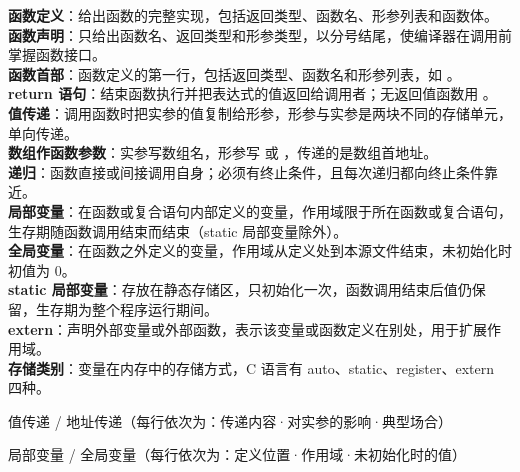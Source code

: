 \documentclass[a4paper,11pt]{article}
\begin{document}
\begin{keyterms}
\textbf{函数定义}：给出函数的完整实现，包括返回类型、函数名、形参列表和函数体。\\
\textbf{函数声明}：只给出函数名、返回类型和形参类型，以分号结尾，使编译器在调用前掌握函数接口。\\
\textbf{函数首部}：函数定义的第一行，包括返回类型、函数名和形参列表，如 。\\
\textbf{return 语句}：结束函数执行并把表达式的值返回给调用者；无返回值函数用 。\\
\textbf{值传递}：调用函数时把实参的值复制给形参，形参与实参是两块不同的存储单元，单向传递。\\
\textbf{数组作函数参数}：实参写数组名，形参写  或 ，传递的是数组首地址。\\
\textbf{递归}：函数直接或间接调用自身；必须有终止条件，且每次递归都向终止条件靠近。\\
\textbf{局部变量}：在函数或复合语句内部定义的变量，作用域限于所在函数或复合语句，生存期随函数调用结束而结束（static 局部变量除外）。\\
\textbf{全局变量}：在函数之外定义的变量，作用域从定义处到本源文件结束，未初始化时初值为 0。\\
\textbf{static 局部变量}：存放在静态存储区，只初始化一次，函数调用结束后值仍保留，生存期为整个程序运行期间。\\
\textbf{extern}：声明外部变量或外部函数，表示该变量或函数定义在别处，用于扩展作用域。\\
\textbf{存储类别}：变量在内存中的存储方式，C 语言有 auto、static、register、extern 四种。
\end{keyterms}

\begin{contrast}{值传递 / 地址传递（每行依次为：传递内容·对实参的影响·典型场合）}
\end{contrast}

\begin{contrast}{局部变量 / 全局变量（每行依次为：定义位置·作用域·未初始化时的值）}
\end{contrast}
\end{document}
